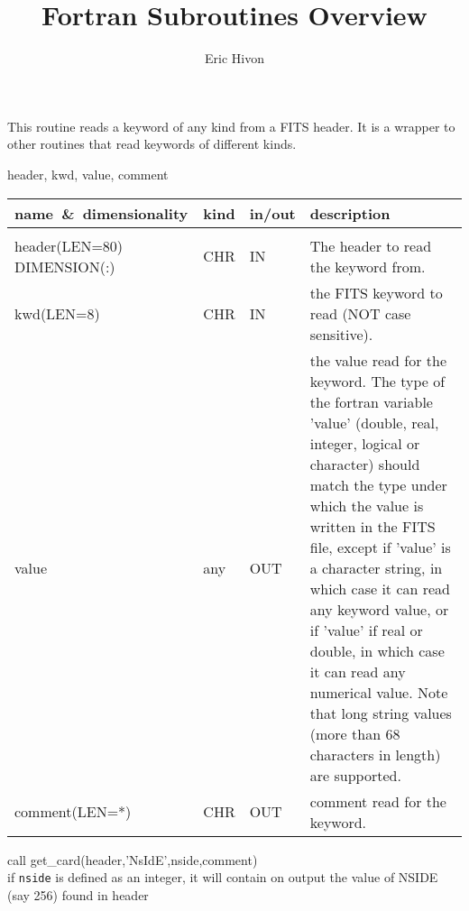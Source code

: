 
\sloppy

\title{\healpix Fortran Subroutines Overview}
 \section[get\_card]{ }
\label{sub:get_card}
\author{Eric Hivon}

\begin{facility}
{This routine reads a keyword of any kind from a FITS header. It is a wrapper to
other routines that read keywords of different kinds.}
{\modHeadFits}
\end{facility}

\begin{f90format}
{header, kwd, value, comment}
\end{f90format}

\begin{arguments}
{
\begin{tabular}{p{0.4\hsize} p{0.05\hsize} p{0.1\hsize} p{0.35\hsize}} \hline  
\textbf{name~\&~dimensionality} & \textbf{kind} & \textbf{in/out} & \textbf{description} \\ \hline
                   &   &   &                           \\ %
header(LEN=80) DIMENSION(:) & CHR & IN & The header to read the keyword from. \\
kwd(LEN=8) & CHR & IN & the FITS keyword to read (NOT case sensitive). \\
value & any & OUT & the value read for the keyword. 
The type of the fortran variable 'value' (double, real, integer, logical or
                   character) should match the type under which the
                   value is written in the FITS file, except if
                   'value' is a character string, in which case it can read any
                   keyword value, or if 'value' if real or double, in which case
                   it can read any numerical value. Note that long string values
(more than 68 characters in length) are supported.\\
comment(LEN=*) & CHR & OUT & comment read for the keyword. \\ 
\end{tabular}
}
\end{arguments}

\begin{example}
{
call get\_card(header,'NsIdE',nside,comment)  \\
}
{
if {\tt nside} is defined as an integer, it
will contain on output the value of NSIDE (say 256) found in header
}
\end{example}

